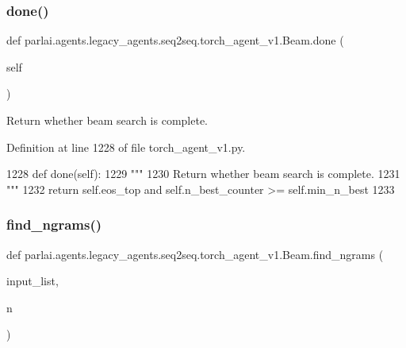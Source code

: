 \subsubsection{\texorpdfstring{done()}{done()}}
{\footnotesize\ttfamily def parlai.\+agents.\+legacy\+\_\+agents.\+seq2seq.\+torch\+\_\+agent\+\_\+v1.\+Beam.\+done (\begin{DoxyParamCaption}\item[{}]{self }\end{DoxyParamCaption})}

\begin{DoxyVerb}Return whether beam search is complete.
\end{DoxyVerb}
 

Definition at line 1228 of file torch\+\_\+agent\+\_\+v1.\+py.


\begin{DoxyCode}
1228     \textcolor{keyword}{def }done(self):
1229         \textcolor{stringliteral}{"""}
1230 \textcolor{stringliteral}{        Return whether beam search is complete.}
1231 \textcolor{stringliteral}{        """}
1232         \textcolor{keywordflow}{return} self.eos\_top \textcolor{keywordflow}{and} self.n\_best\_counter >= self.min\_n\_best
1233 
\end{DoxyCode}
\mbox{\label{classparlai_1_1agents_1_1legacy__agents_1_1seq2seq_1_1torch__agent__v1_1_1Beam_afb6aafacc0ad6d28539fe1406468ae66}} 
\subsubsection{\texorpdfstring{find\+\_\+ngrams()}{find\_ngrams()}}
{\footnotesize\ttfamily def parlai.\+agents.\+legacy\+\_\+agents.\+seq2seq.\+torch\+\_\+agent\+\_\+v1.\+Beam.\+find\+\_\+ngrams (\begin{DoxyParamCaption}\item[{}]{input\+\_\+list,  }\item[{}]{n }\end{DoxyParamCaption})\hspace{0.3cm}{\ttfamily [static]}}


